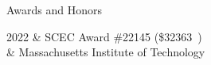 \begin{rSection}{Awards and Honors}
	\begin{timeline}
		2022 & SCEC Award \#22145 (\$\SI{32363})\\
			& Massachusetts Institute of Technology
	\end{timeline}
\end{rSection}